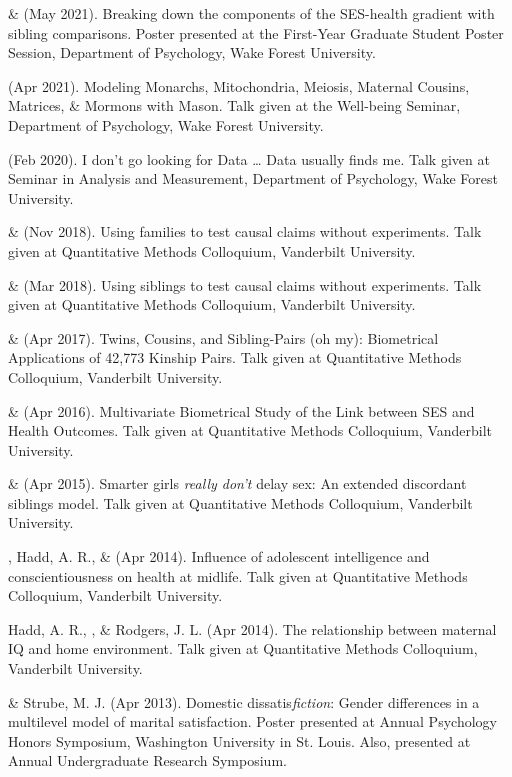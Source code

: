 

\item \yrh \& \meb (May 2021). Breaking down the components of the SES-health gradient with sibling comparisons. Poster presented at the First-Year Graduate Student Poster Session, Department of Psychology, Wake Forest University. 

\item\meb (Apr 2021). Modeling Monarchs, Mitochondria, Meiosis, Maternal Cousins, Matrices, \& Mormons with Mason. Talk given at the Well-being Seminar, Department of Psychology, Wake Forest University. 

\item\meb (Feb 2020). I don't go looking for Data … Data usually finds me. Talk given at Seminar in Analysis and Measurement, Department of Psychology, Wake Forest University. 
%
\item\meb \& \Joe (Nov 2018). Using families to test causal claims without experiments. Talk given at Quantitative Methods Colloquium, Vanderbilt University. 

\item\meb \& \Joe (Mar 2018). Using siblings to test causal claims without experiments. Talk given at Quantitative Methods Colloquium, Vanderbilt University.
%
\item\meb \& \Joe (Apr 2017). Twins, Cousins, and Sibling-Pairs (oh my): Biometrical Applications of 42,773 Kinship Pairs. Talk given at Quantitative Methods Colloquium, Vanderbilt University. %
%
\item\meb \& \Joe (Apr 2016). Multivariate Biometrical Study of the Link between SES and Health Outcomes. Talk given at Quantitative Methods Colloquium, Vanderbilt University.
%
\item\meb \& \Joe (Apr 2015). Smarter girls \textit{really don't} delay sex: An extended discordant siblings model. Talk given at Quantitative Methods Colloquium, Vanderbilt University.
\item\meb, Hadd, A. R., \& \Joe (Apr 2014). Influence of adolescent intelligence and conscientiousness on health at midlife. Talk given at Quantitative Methods Colloquium, Vanderbilt University. 
%
\item Hadd, A. R., \meb, \& Rodgers, J. L. (Apr 2014). The relationship between maternal IQ and home environment. Talk given at Quantitative Methods Colloquium, Vanderbilt University.
%
\item\meb \& Strube, M. J. (Apr 2013). Domestic dissatis{\em fiction}: Gender differences in a multilevel model of marital satisfaction. Poster presented at Annual Psychology Honors Symposium, Washington University in St. Louis. Also, presented at Annual Undergraduate Research Symposium.
%